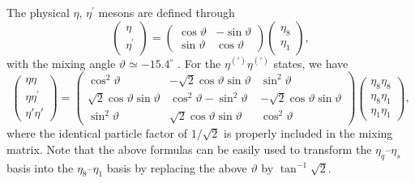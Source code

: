 \documentclass[aps,preprint,floats,epsf,epsfig,nofootinbib,letter]{revtex4}
\begin{document}
The physical
$\eta,\,\eta^\prime$ mesons are defined through
\begin{equation}
\left(
\begin{array}{c}
\eta\\
      \eta^\prime
\end{array}
\right)= \left(
\begin{array}{cc}
\cos\vartheta &-\sin\vartheta\\
\sin\vartheta &\cos\vartheta
\end{array}
\right) \left(
\begin{array}{c}

\eta_8\\
      \eta_1
\end{array}
\right),
\end{equation}
with the mixing angle $\vartheta\simeq-15.4^\circ$
\cite{Feldmann:1998vh}. For the $\eta^{(\prime)}\eta^{(\prime)}$
states, we have
\begin{equation}
\left(
\begin{array}{c}
\eta\eta\\
      \eta\eta^\prime\\
      \eta'\eta'
\end{array}
\right)= \left(
\begin{array}{ccc}
\cos^2\vartheta
   &-\sqrt2\cos\vartheta \sin\vartheta
   &\sin^2\vartheta\\
\sqrt2\cos\vartheta \sin\vartheta
   &\cos^2\vartheta-\sin^2\vartheta
   &-\sqrt2\cos\vartheta \sin\vartheta\\
\sin^2\vartheta
   &\sqrt2\cos\vartheta \sin\vartheta
   &\cos^2\vartheta
\end{array}
\right) \left(
\begin{array}{c}
\eta_8\eta_8\\
      \eta_8\eta_1\\
      \eta_1\eta_1
\end{array}
\right),
\end{equation}
where the identical particle factor of $1/\sqrt2$ is properly
included in the mixing matrix.
Note that the above formulas can be easily used to transform the $\eta_q$--$\eta_s$ basis into the $\eta_8$--$\eta_1$ basis by replacing the above $\vartheta$ by 
$\tan^{-1}\sqrt2$.
\end{document}
